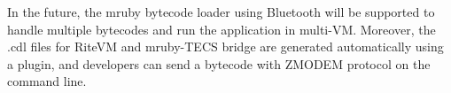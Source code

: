 \documentclass[conference,compsoc]{IEEEtran}
\begin{document}
In the future, the mruby bytecode loader using Bluetooth will be supported to handle multiple bytecodes and run the application in multi-VM.
Moreover, the .cdl files for RiteVM and mruby-TECS bridge are generated automatically using a plugin, and developers can send a bytecode with ZMODEM protocol on the command line.



\end{document}

